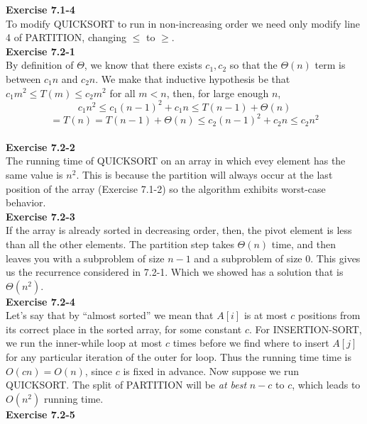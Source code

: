 \documentclass{article}
\begin{document}
\noindent\textbf{Exercise 7.1-4}\\

To modify QUICKSORT to run in non-increasing order we need only modify line 4 of PARTITION, changing $\leq$ to $\geq$. \\

\noindent\textbf{Exercise 7.2-1}\\

By definition of $\Theta$, we know that there exists $c_1,c_2$ so that the $\Theta(n)$ term is between $c_1 n$ and $c_2 n$. We make that inductive hypothesis be that $c_1 m^2 \le T(m) \le c_2 m^2$ for all $m < n$, then, for large enough $n$, 
\[c_1 n^2 \le c_1 (n-1)^2 + c_1 n \le T(n-1) + \Theta(n)\] \[= T(n) = T(n-1) + \Theta(n) \le c_2 (n-1)^2 +c_2 n \le c_2 n^2\]\\


\noindent\textbf{Exercise 7.2-2}\\

The running time of QUICKSORT on an array in which evey element has the same value is $n^2$.  This is because the partition will always occur at the last position of the array (Exercise 7.1-2) so the algorithm exhibits worst-case behavior. \\

\noindent\textbf{Exercise 7.2-3}\\

If the array is already sorted in decreasing order, then, the pivot element is less than all the other elements. The partition step takes $\Theta(n)$ time, and then leaves you with a subproblem of size $n-1$ and a subproblem of size 0. This gives us the recurrence considered in 7.2-1. Which we showed has a solution that is $\Theta(n^2)$.\\

\noindent\textbf{Exercise 7.2-4}\\

Let's say that by ``almost sorted'' we mean that $A[i]$ is at most $c$ positions from its correct place in the sorted array, for some constant $c$. For INSERTION-SORT, we run the inner-while loop at most $c$ times before we find where to insert $A[j]$ for any particular iteration of the outer for loop.  Thus the running time time is $O(cn) = O(n)$, since $c$ is fixed in advance.  Now suppose we run QUICKSORT.  The split of PARTITION will be \emph{at best} $n-c$ to $c$, which leads to $O(n^2)$ running time. \\

\noindent\textbf{Exercise 7.2-5}\\
\end{document}
